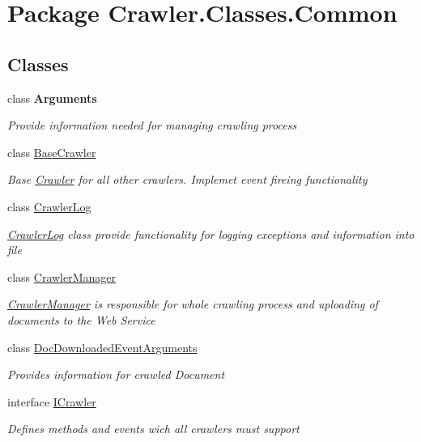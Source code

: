 \hypertarget{namespace_crawler_1_1_classes_1_1_common}{\section{Package Crawler.\-Classes.\-Common}
\label{namespace_crawler_1_1_classes_1_1_common}
}
\subsection*{Classes}
\begin{DoxyCompactItemize}
\item 
class {\bfseries Arguments}
\begin{DoxyCompactList}\small\item\em Provide information needed for managing crawling process \end{DoxyCompactList}\item 
class \hyperlink{class_crawler_1_1_classes_1_1_common_1_1_base_crawler}{Base\-Crawler}
\begin{DoxyCompactList}\small\item\em Base \hyperlink{namespace_crawler}{Crawler} for all other crawlers. Implemet event fireing functionality \end{DoxyCompactList}\item 
class \hyperlink{class_crawler_1_1_classes_1_1_common_1_1_crawler_log}{Crawler\-Log}
\begin{DoxyCompactList}\small\item\em \hyperlink{class_crawler_1_1_classes_1_1_common_1_1_crawler_log}{Crawler\-Log} class provide functionality for logging exceptions and information into file \end{DoxyCompactList}\item 
class \hyperlink{class_crawler_1_1_classes_1_1_common_1_1_crawler_manager}{Crawler\-Manager}
\begin{DoxyCompactList}\small\item\em \hyperlink{class_crawler_1_1_classes_1_1_common_1_1_crawler_manager}{Crawler\-Manager} is responsible for whole crawling process and uploading of documents to the Web Service \end{DoxyCompactList}\item 
class \hyperlink{class_crawler_1_1_classes_1_1_common_1_1_doc_downloaded_event_arguments}{Doc\-Downloaded\-Event\-Arguments}
\begin{DoxyCompactList}\small\item\em Provides information for crawled Document \end{DoxyCompactList}\item 
interface \hyperlink{interface_crawler_1_1_classes_1_1_common_1_1_i_crawler}{I\-Crawler}
\begin{DoxyCompactList}\small\item\em Defines methods and events wich all crawlers must support \end{DoxyCompactList}\end{DoxyCompactItemize}
